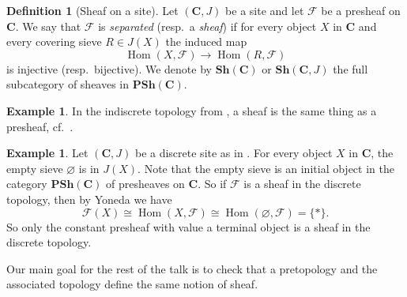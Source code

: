 \documentclass[12pt,reqno,a4paper]{amsart}
\theoremstyle{plain}
\theoremstyle{definition}
\newtheorem{defn}[thm]{Definition}
\newtheorem{exmp}[thm]{Example}
\theoremstyle{remark}
\begin{document}
\begin{defn}[Sheaf on a site]
  Let $(\mathbf{C},J)$ be a site and let $\mathscr{F}$ be a presheaf on $\mathbf{C}$.
  We say that $\mathscr{F}$ is \textit{separated} (resp.~a \textit{sheaf}) if for every object $X$ in $\mathbf{C}$ and every covering sieve $R \in J(X)$ the induced map
  \[ \operatorname{Hom}(X,\mathscr{F}) \to \operatorname{Hom}(R,\mathscr{F}) \]
  is injective (resp.~bijective).
  We denote by $\mathbf{Sh}(\mathbf{C})$ or $\mathbf{Sh}(\mathbf{C},J)$ the full subcategory of sheaves in $\mathbf{PSh}(\mathbf{C})$.
\end{defn}

\begin{exmp}\label{exmp:indiscretesheaf}
  In the indiscrete topology from , a sheaf is the same thing as a presheaf, cf.~.
\end{exmp}

\begin{exmp}\label{exmp:discretesheaf}
  Let $(\mathbf{C},J)$ be a discrete site as in .
  For every object $X$ in $\mathbf{C}$, the empty sieve $\varnothing$ is in $J(X)$.
  Note that the empty sieve is an initial object in the category $\mathbf{PSh}(\mathbf{C})$ of presheaves on $\mathbf{C}$.
  So if $\mathscr{F}$ is a sheaf in the discrete topology, then by Yoneda we have
  \[ \mathscr{F}(X) \cong \operatorname{Hom}(X,\mathscr{F}) \cong \operatorname{Hom}(\varnothing, \mathscr{F}) = \{ * \}. \]
  So only the constant presheaf with value a terminal object is a sheaf in the discrete topology.
\end{exmp}

Our main goal for the rest of the talk is to check that a pretopology and the associated topology define the same notion of sheaf.
\end{document}

